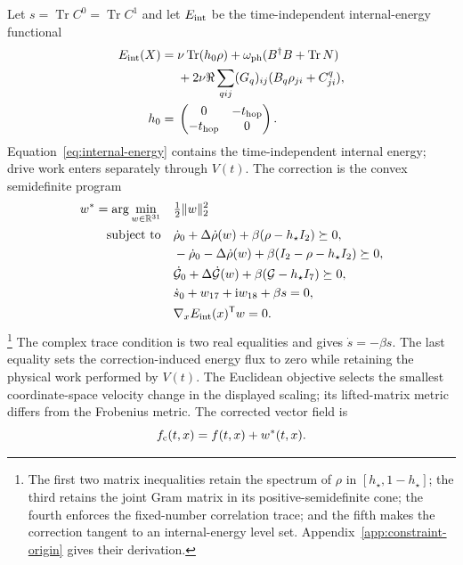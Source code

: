 \documentclass[10pt,twocolumn]{article}
\newcommand{\ii}{\mathrm i}
\newcommand{\R}{\mathbb R}
\newcommand{\I}{I}
\newcommand{\Tr}{\operatorname{Tr}}
\newcommand{\norm}[1]{\lVert#1\rVert}
\begin{document}
Let $s=\Tr C^0=\Tr C^1$ and let $E_{\rm int}$ be the time-independent
internal-energy functional
\begin{equation}
\begin{aligned}
E_{\rm int}(X)={}&\nu\Tr(h_0\rho)
+\omega_{\rm ph}(B^\dagger B+\Tr N)\\
&+2\nu\Re\sum_{qij}(G_q)_{ij}
(B_q\rho_{ji}+C^q_{ji}),\\
h_0={}&\begin{pmatrix}0&-t_{\rm hop}\\-t_{\rm hop}&0\end{pmatrix}.
\end{aligned}
\label{eq:internal-energy}
\end{equation}
Equation~\eqref{eq:internal-energy} contains the time-independent internal
energy; drive work enters separately through $V(t)$.  The correction is the
convex semidefinite program~\cite{vandenbergheBoyd1996}
{\footnotesize
\begin{equation}
\begin{aligned}
w^*=\arg\min_{w\in\R^{31}}\quad&\tfrac12\norm{w}_2^2\\
\text{subject to}\quad
&\dot\rho_0+\Delta\dot\rho(w)+\beta(\rho-h_\star\I_2)\succeq0,\\
&-\dot\rho_0-\Delta\dot\rho(w)
+\beta(\I_2-\rho-h_\star\I_2)\succeq0,\\
&\dot{\mathcal G}_0+\Delta\dot{\mathcal G}(w)
+\beta(\mathcal G-h_\star\I_7)\succeq0,\\
&\dot s_0+w_{17}+\ii w_{18}+\beta s=0,\\
&\nabla_xE_{\rm int}(x)^{\mathsf T}w=0.
\end{aligned}
\label{eq:correction-sdp}
\end{equation}}%
\footnote{The first two matrix inequalities retain the spectrum of $\rho$ in
$[h_\star,1-h_\star]$; the third retains the joint Gram matrix in its
positive-semidefinite cone; the fourth enforces the fixed-number correlation
trace; and the fifth makes the correction tangent to an internal-energy level
set.  Appendix~\ref{app:constraint-origin} gives their derivation.}
The complex trace condition is two real equalities and gives
$\dot s=-\beta s$.  The last equality sets the correction-induced energy
flux to zero while retaining the physical work performed by $V(t)$.  The
Euclidean objective selects the smallest coordinate-space velocity change in
the displayed scaling; its lifted-matrix metric differs from the Frobenius
metric.  The corrected vector
field is
\begin{equation}
f_{\rm c}(t,x)=f(t,x)+w^*(t,x).
\label{eq:corrected-field}
\end{equation}
\end{document}
